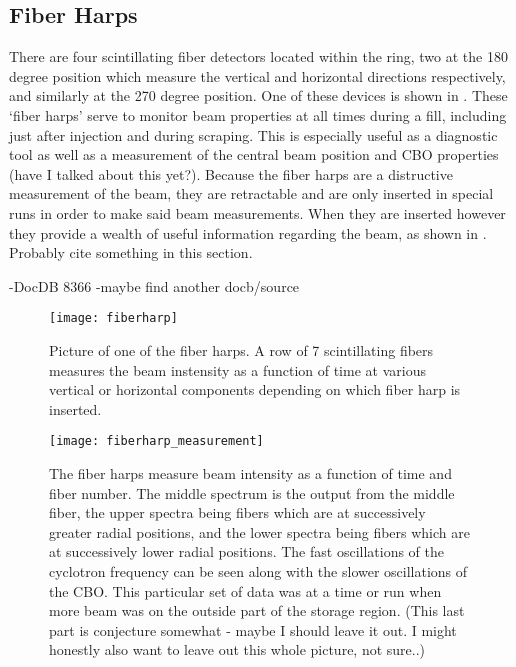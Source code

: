 \subsection{Fiber Harps}
\label{sec:FiberHarps}

There are four scintillating fiber detectors located within the ring, two at the 180 degree position which measure the vertical and horizontal directions respectively, and similarly at the 270 degree position. One of these devices is shown in . These `fiber harps' serve to monitor beam properties at all times during a fill, including just after injection and during scraping. This is especially useful as a diagnostic tool as well as a measurement of the central beam position and CBO properties (have I talked about this yet?). Because the fiber harps are a distructive measurement of the beam, they are retractable and are only inserted in special runs in order to make said beam measurements. When they are inserted however they provide a wealth of useful information regarding the beam, as shown in . Probably cite something in this section.

-DocDB 8366
-maybe find another docb/source

\begin{figure}[]
    \centering
    \texttt{[image: fiberharp]}
    \caption[Fiber Harp]{Picture of one of the fiber harps. A row of 7 scintillating fibers measures the beam instensity as a function of time at various vertical or horizontal components depending on which fiber harp is inserted.}   
    \label{fig:fiberharp}
\end{figure}

\begin{figure}[]
    \centering
    \texttt{[image: fiberharp\_measurement]}
    \caption[Fiber Harp Measurement]{The fiber harps measure beam intensity as a function of time and fiber number. The middle spectrum is the output from the middle fiber, the upper spectra being fibers which are at successively greater radial positions, and the lower spectra being fibers which are at successively lower radial positions. The fast oscillations of the cyclotron frequency can be seen along with the slower oscillations of the CBO. This particular set of data was at a time or run when more beam was on the outside part of the storage region. (This last part is conjecture somewhat - maybe I should leave it out. I might honestly also want to leave out this whole picture, not sure..)}   
    \label{fig:fiberharp_measurement}
\end{figure}


